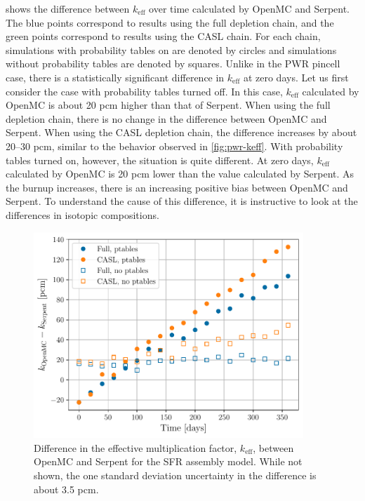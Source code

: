 \documentclass[3p,authoryear]{elsarticle}
\begin{document}

 shows the difference between $k_\text{eff}$ over time
calculated by OpenMC and Serpent. The blue points correspond to results using
the full depletion chain, and the green points correspond to results using the
CASL chain. For each chain, simulations with probability tables on are denoted
by circles and simulations without probability tables are denoted by squares.
Unlike in the PWR pincell case, there is a statistically significant difference
in $k_\text{eff}$ at zero days. Let us first consider the case with probability
tables turned off. In this case, $k_\text{eff}$ calculated by OpenMC is about 20
pcm higher than that of Serpent. When using the full depletion chain, there is
no change in the difference between OpenMC and Serpent. When using the CASL
depletion chain, the difference increases by about 20--30 pcm, similar to the
behavior observed in \cref{fig:pwr-keff}. With probability tables turned on,
however, the situation is quite different. At zero days, $k_\text{eff}$
calculated by OpenMC is 20 pcm lower than the value calculated by Serpent. As
the burnup increases, there is an increasing positive bias between OpenMC and
Serpent. To understand the cause of this difference, it is instructive to look
at the differences in isotopic compositions.
\begin{figure}[H]
  \centering
  \includegraphics[width=4in]{figures/sfr_keff.pdf}
  \caption{Difference in the effective multiplication factor, $k_\text{eff}$,
  between OpenMC and Serpent for the SFR assembly model. While not shown, the one
  standard deviation uncertainty in the difference is about 3.5 pcm.}
  \label{fig:sfr-keff}
\end{figure}
\end{document}
